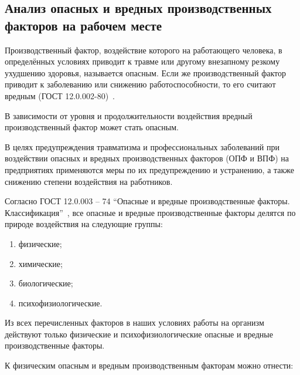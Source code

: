 \subsection{Анализ опасных и вредных производственных факторов на рабочем месте}
Производственный фактор, воздействие которого на работающего человека, в определённых условиях приводит к травме или другому внезапному резкому ухудшению здоровья, называется опасным. Если же производственный фактор приводит к заболеванию или снижению работоспособности, то его считают вредным (ГОСТ 12.0.002-80)~\cite{OT9}.

В зависимости от уровня и продолжительности воздействия вредный производственный фактор может стать опасным.

В целях предупреждения травматизма и профессиональных заболеваний при воздействии опасных и вредных производственных факторов (ОПФ и ВПФ) на предприятиях применяются меры по их предупреждению и устранению, а также снижению степени воздействия на работников.

Согласно ГОСТ 12.0.003 – 74 ``Опасные и вредные производственные факторы. Классификация''~\cite{OT8}, все опасные и вредные производственные факторы делятся по природе воздействия на следующие группы:

\begin{enumerate}
\item физические;
\item химические;
\item биологические;
\item психофизиологические.
\end{enumerate}
Из всех перечисленных факторов в наших условиях работы на организм действуют только физические и психофизиологические опасные и вредные производственные факторы.

К физическим опасным и вредным производственным факторам можно отнести:

